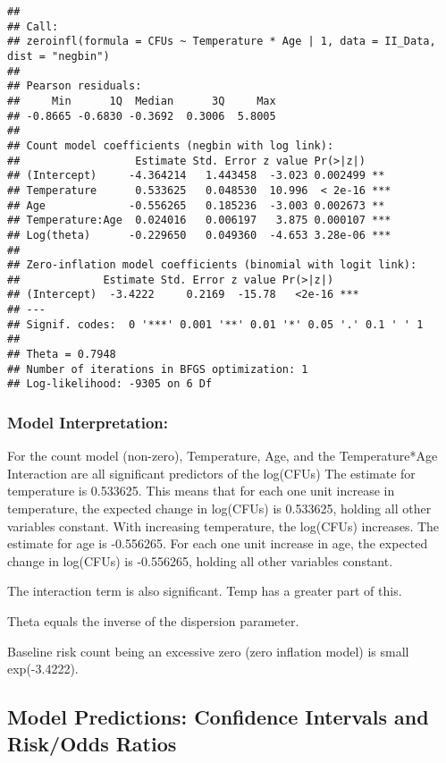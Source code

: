 \documentclass[
]{article}
\begin{document}
\begin{verbatim}
## 
## Call:
## zeroinfl(formula = CFUs ~ Temperature * Age | 1, data = II_Data, dist = "negbin")
## 
## Pearson residuals:
##     Min      1Q  Median      3Q     Max 
## -0.8665 -0.6830 -0.3692  0.3006  5.8005 
## 
## Count model coefficients (negbin with log link):
##                  Estimate Std. Error z value Pr(>|z|)    
## (Intercept)     -4.364214   1.443458  -3.023 0.002499 ** 
## Temperature      0.533625   0.048530  10.996  < 2e-16 ***
## Age             -0.556265   0.185236  -3.003 0.002673 ** 
## Temperature:Age  0.024016   0.006197   3.875 0.000107 ***
## Log(theta)      -0.229650   0.049360  -4.653 3.28e-06 ***
## 
## Zero-inflation model coefficients (binomial with logit link):
##             Estimate Std. Error z value Pr(>|z|)    
## (Intercept)  -3.4222     0.2169  -15.78   <2e-16 ***
## ---
## Signif. codes:  0 '***' 0.001 '**' 0.01 '*' 0.05 '.' 0.1 ' ' 1 
## 
## Theta = 0.7948 
## Number of iterations in BFGS optimization: 1 
## Log-likelihood: -9305 on 6 Df
\end{verbatim}

\hypertarget{model-interpretation}{%
\subsubsection{Model Interpretation:}\label{model-interpretation}}

For the count model (non-zero), Temperature, Age, and the
Temperature*Age Interaction are all significant predictors of the
log(CFUs) The estimate for temperature is 0.533625. This means that for
each one unit increase in temperature, the expected change in log(CFUs)
is 0.533625, holding all other variables constant. With increasing
temperature, the log(CFUs) increases. The estimate for age is -0.556265.
For each one unit increase in age, the expected change in log(CFUs) is
-0.556265, holding all other variables constant.

The interaction term is also significant. Temp has a greater part of
this.

Theta equals the inverse of the dispersion parameter.

Baseline risk count being an excessive zero (zero inflation model) is
small exp(-3.4222).

\hypertarget{model-predictions-confidence-intervals-and-riskodds-ratios}{%
\subsection{Model Predictions: Confidence Intervals and Risk/Odds
Ratios}\label{model-predictions-confidence-intervals-and-riskodds-ratios}}
\end{document}
